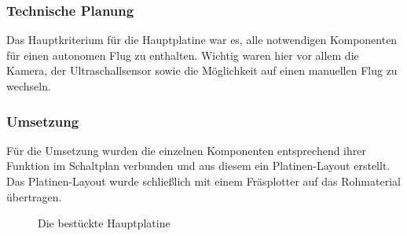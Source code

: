     \subsubsection{Technische Planung}
    Das Hauptkriterium für die Hauptplatine war es, alle notwendigen Komponenten für einen autonomen Flug zu enthalten. Wichtig waren hier vor allem die Kamera,
    der Ultraschallsensor sowie die Möglichkeit auf einen manuellen Flug zu wechseln.

    \subsubsection{Umsetzung}
    Für die Umsetzung wurden die einzelnen Komponenten entsprechend ihrer Funktion im Schaltplan verbunden und aus diesem ein Platinen-Layout erstellt.
    Das Platinen-Layout wurde schließlich mit einem Fräsplotter auf das Rohmaterial übertragen.

    \begin{figure}[tbh]
      \begin{centering}
      \par\end{centering}
      \caption{Die bestückte Hauptplatine}
      \label{Hauptplatine}
    \end{figure}

